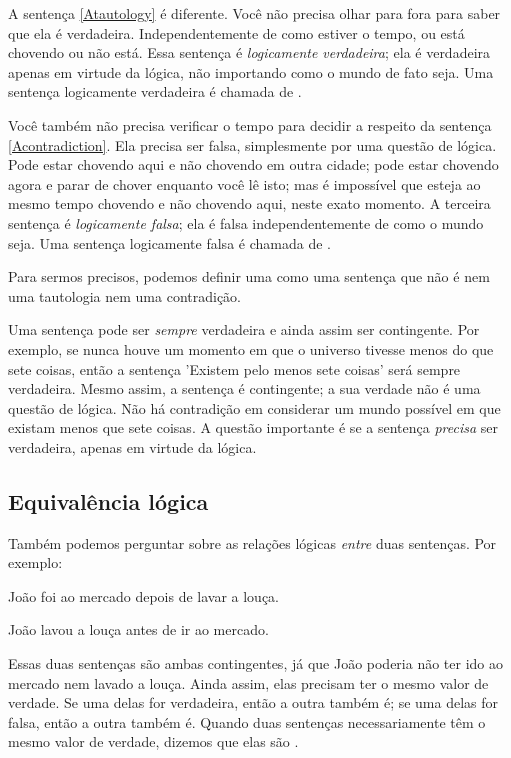 A sentença \ref{Atautology} é diferente. Você não precisa olhar para fora para saber que ela é verdadeira. Independentemente de como estiver o tempo, ou está chovendo ou não está. Essa sentença é \emph{logicamente verdadeira}; ela é verdadeira apenas em virtude da lógica, não importando como o mundo de fato seja. Uma sentença logicamente verdadeira é chamada de .

Você também não precisa verificar o tempo para decidir a respeito da sentença \ref{Acontradiction}. Ela precisa ser falsa, simplesmente por uma questão de lógica. Pode estar chovendo aqui e não chovendo em outra cidade; pode estar chovendo agora e parar de chover enquanto você lê isto; mas é impossível que esteja ao mesmo tempo chovendo e não chovendo aqui, neste exato momento. A terceira sentença é \emph{logicamente falsa}; ela é falsa independentemente de como o mundo seja. Uma sentença logicamente falsa é chamada de .

Para sermos precisos, podemos definir uma  como uma sentença que não é nem uma tautologia nem uma contradição.

Uma sentença pode ser \emph{sempre} verdadeira e ainda assim ser contingente. Por exemplo, se nunca houve um momento em que o universo tivesse menos do que sete coisas, então a sentença 'Existem pelo menos sete coisas' será sempre verdadeira. Mesmo assim, a sentença é contingente; a sua verdade não é uma questão de lógica. Não há contradição em considerar um mundo possível em que existam menos que sete coisas. A questão importante é se a sentença \emph{precisa} ser verdadeira, apenas em virtude da lógica.

\subsection{Equivalência lógica}
Também podemos perguntar sobre as relações lógicas \emph{entre} duas sentenças. Por exemplo:
\begin{earg}
\item[] João foi ao mercado depois de lavar a louça.
\item[] João lavou a louça antes de ir ao mercado.
\end{earg}
Essas duas sentenças são ambas contingentes, já que João poderia não ter ido ao mercado nem lavado a louça. Ainda assim, elas precisam ter o mesmo valor de verdade. Se uma delas for verdadeira, então a outra também é; se uma delas for falsa, então a outra também é. Quando duas sentenças necessariamente têm o mesmo valor de verdade, dizemos que elas são .


